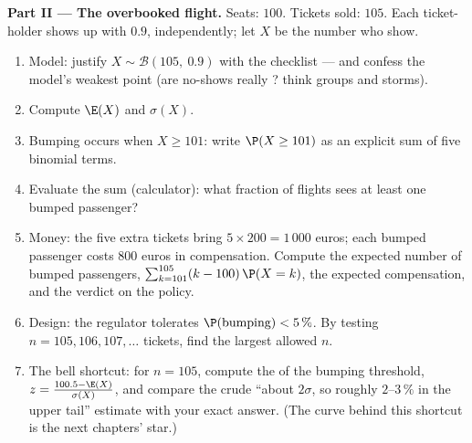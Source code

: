 \begin{problem}
\medskip
\noindent\textbf{Part II --- The overbooked flight.}
Seats: $100$. Tickets sold: $105$. Each ticket-holder shows up
with  $0.9$, independently; let $X$ be the number who
show.
\begin{enumerate}[resume]
  \item Model: justify $X \sim \mathcal B(105,\ 0.9)$ with the
        checklist --- and confess the model's weakest point
        (are no-shows really ? think groups and
        storms).
  \item Compute $\E(X)$ and $\sigma(X)$.
  \item Bumping occurs when $X \geq 101$: write
        $\P(X \geq 101)$ as an explicit sum of five binomial
        terms.
  \item Evaluate the sum (calculator): what fraction of flights
        sees at least one bumped passenger?
  \item Money: the five extra tickets bring
        $5 \times 200 = 1\,000$ euros; each bumped passenger
        costs $800$ euros in compensation. Compute the expected
        number of bumped passengers,
        $\sum_{k=101}^{105} (k - 100)\,\P(X = k)$, the expected
        compensation, and the verdict on the policy.
  \item Design: the regulator tolerates
        $\P(\text{bumping}) < 5\,\%$. By testing
        $n = 105, 106, 107, \dots$ tickets, find the largest
        allowed $n$.
  \item The bell shortcut: for $n = 105$, compute the 
        of the bumping threshold,
        $z = \frac{100.5 - \E(X)}{\sigma(X)}$, and compare the
        crude ``about $2\sigma$, so roughly $2$--$3\,\%$ in the
        upper tail'' estimate with your exact answer. (The
        curve behind this shortcut is the next chapters'
        star.)
\end{enumerate}


\end{problem}
